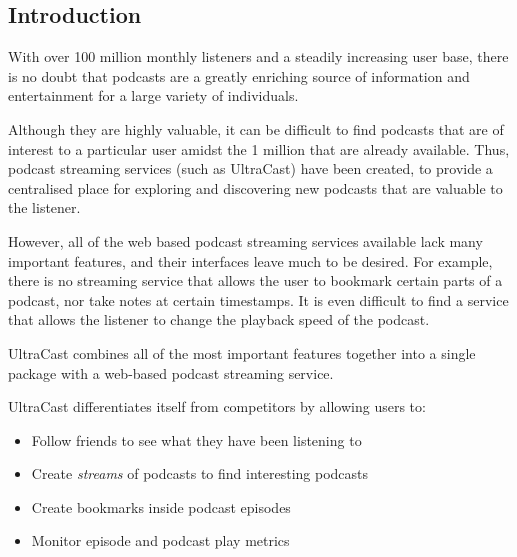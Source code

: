 \documentclass[../report.tex]{subfiles}
\begin{document}
   

\subsection{Introduction}

With over 100 million monthly listeners \cite{musicoomph} and a steadily increasing user base, there is no doubt that podcasts are a greatly enriching source of information and entertainment for a large variety of individuals.

Although they are highly valuable, it can be difficult to find podcasts that are of interest to a particular user amidst the 1 million \cite{musicoomph} that are already available.
Thus, podcast streaming services (such as UltraCast) have been created, to provide a centralised place for exploring and discovering new podcasts that are valuable to the listener.

However, all of the web based podcast streaming services available lack many important features, and their interfaces leave much to be desired. For example, there is no streaming service that allows the user to bookmark certain parts of a podcast, nor take notes at certain timestamps. It is even difficult to find a service that allows the listener to change the playback speed of the podcast.

UltraCast combines all of the most important features together into a single package with a web-based podcast streaming service.

UltraCast differentiates itself from competitors by allowing users to:
\begin{itemize}
    \item Follow friends to see what they have been listening to
    \item Create \textit{streams} of podcasts to find interesting podcasts
    \item Create bookmarks inside podcast episodes
    \item Monitor episode and podcast play metrics
\end{itemize}
\end{document}
